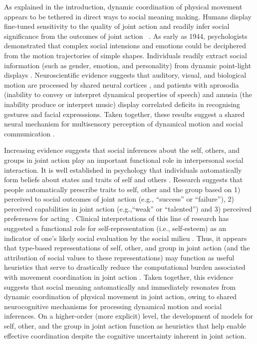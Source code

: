 \begin{CJK}{UTF8}{gbsn}
As explained in the introduction, dynamic coordination of physical movement appears to be tethered in direct ways to social meaning making.  Humans display fine-tuned sensitivity to the quality of joint action and readily infer social significance from the outcomes of joint action ~\citep{Wheatley2016}.  As early as 1944, psychologists \textcite{Heider1944} demonstrated that complex social intensions and emotions could be deciphered from the motion trajectories of simple shapes.  Individuals readily extract social information (such as gender, emotion, and personality) from dynamic point-light displays \citep{Atkinson2004,Clark2005a,Johansson1973}.  Neuroscientific evidence suggests that auditory, visual, and biological motion
are processed by shared neural cortices \citep[e.g., the right superior temporal cortex; see][]{Zatorre2007,Beaucousin2007,Beauchamp2007}, and patients with aprosodia (inability to convey or interpret dynamical properties of speech) and amusia (the inability produce or interpret music) display correlated deficits in recognising gestures and facial expresssions.  Taken together, these results suggest a shared neural mechanism for multisensory perception of dynamical motion and social communication \citep{Wheatley2012,Wheatley2016}.

Increasing evidence suggests that social inferences about the self, others, and groups in joint action play an important functional role in interpersonal social interaction.  It is well established in psychology that individuals automatically form beliefs about states and traits of self and others \citep{Bem1967,Fowler2006}.  Research suggests that people automatically prescribe traits to self, other and the group based on 1) perceived to social outcomes of joint action (e.g., ``success'' or ``failure''), 2) perceived capabilities in joint action (e.g.,``weak'' or ``talented'') and 3) perceived preferences for acting \citep[e.g., ``good,'' ``fair,'' or ``trustworthy'';][]{Moutoussis2014}.  Clinical interpretations of this line of research has suggested a functional role for self-representation (i.e., self-esteem) as an indicator of one's likely social evaluation by the social milieu \citep{Leary1995}. Thus, it appears that type-based representations of self, other, and group in joint action (and the attribution of social values to these representations) may function as useful heuristics that serve to drastically reduce the computational burden associated with movement coordination in joint action \citep{Moutoussis2014}.  Taken together, this evidence suggests that social meaning automatically and immediately resonates from dynamic coordination of physical movement in joint action, owing to shared neurocognitive mechanisms for processing dynamical motion and social inferences.  On a higher-order (more explicit) level, the development of models for self, other, and the group in joint action function as heuristics that help enable effective coordination despite the cognitive uncertainty inherent in joint action.




\end{CJK}
